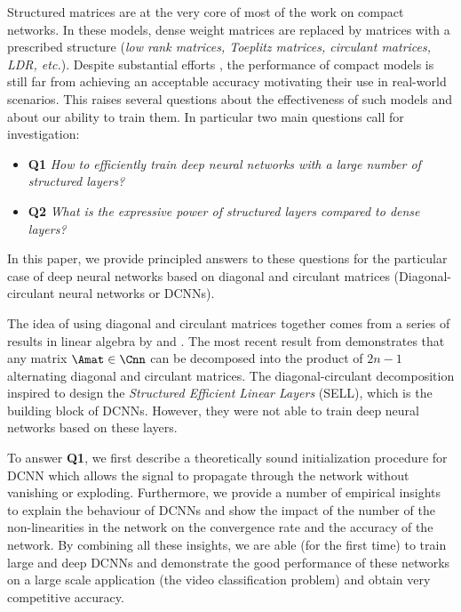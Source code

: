 Structured matrices are at the very core of most of the work on compact networks.
In these models, dense weight matrices are replaced by matrices with a prescribed structure (\emph{low rank matrices, Toeplitz matrices, circulant matrices, LDR, etc.}).
Despite substantial efforts \cite{cheng,moczulski2015acdc}, the performance of compact models is still far from achieving an acceptable accuracy motivating their use in real-world scenarios.
This raises several questions about the effectiveness of such models and about our ability to train them. In particular two main questions call for investigation:
\begin{itemize}
  \item[] \textbf{Q1} \emph{How to efficiently train deep neural networks with a large number of structured layers?}
  \item[] \textbf{Q2} \emph{What is the expressive power of structured layers compared to dense layers?}
\end{itemize}


In this paper, we provide principled answers to these questions for the particular case of deep neural networks based on diagonal and circulant matrices (\aka Diagonal-circulant neural networks or DCNNs). 

The idea of using diagonal and circulant matrices together comes from a series of results in linear algebra by \citet{muller1998algorithmic} and \citet{Huhtanen2015}.
The most recent result from \citet{Huhtanen2015} demonstrates that any matrix $\Amat \in \Cnn$ can be decomposed into the product of $2n-1$ alternating diagonal and circulant matrices.
The diagonal-circulant decomposition inspired \citet{moczulski2015acdc} to design the \emph{Structured Efficient Linear Layers} (SELL), which is the building block of DCNNs.
However, they were not able to train deep neural networks based on these layers. 

To answer \textbf{Q1}, we first describe a theoretically sound initialization procedure for DCNN which allows the signal to propagate through the network without vanishing or exploding.
Furthermore, we provide a number of empirical insights to explain the behaviour of DCNNs and show the impact of the number of the non-linearities in the network on the convergence rate and the accuracy of the network. 
By combining all these insights, we are able (for the first time) to train large and deep DCNNs and demonstrate the good performance of these networks on a large scale application (the \yt video classification problem) and obtain very competitive accuracy. 

